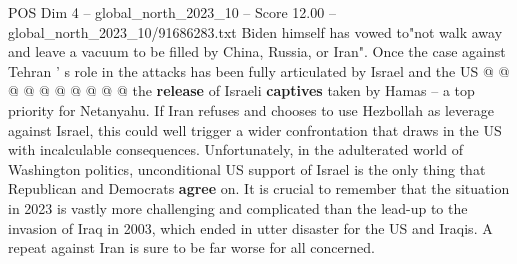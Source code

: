 \begin{textsample}{POS Dim 4 – global\_north\_2023\_10 – Score 12.00 – global\_north\_2023\_10/91686283.txt}
Biden himself has vowed to"not walk away and leave a vacuum to be filled by China, Russia, or Iran".
Once the case against Tehran ' s role in the attacks has been fully articulated by Israel and the US @ @ @ @ @ @ @ @ @ @ the \textbf{release} of Israeli \textbf{captives} taken by Hamas -- a top priority for Netanyahu.
If Iran refuses and chooses to use Hezbollah as leverage against Israel, this could well trigger a wider confrontation that draws in the US with incalculable consequences.
Unfortunately, in the adulterated world of Washington politics, unconditional US support of Israel is the only thing that Republican and Democrats \textbf{agree} on.
It is crucial to remember that the situation in 2023 is vastly more challenging and complicated than the lead-up to the invasion of Iraq in 2003, which ended in utter disaster for the US and Iraqis.
A repeat against Iran is sure to be far worse for all concerned.

\end{textsample}
